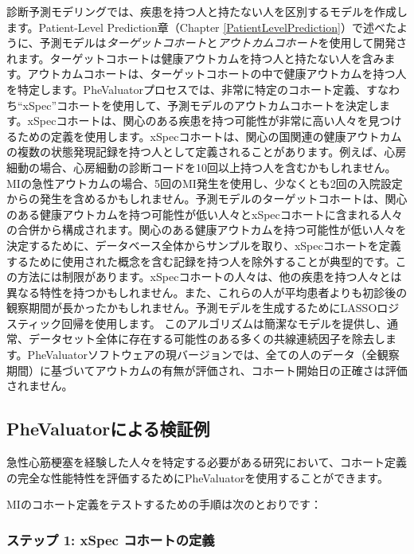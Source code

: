 \documentclass[
  11pt]{book}
\theoremstyle{definition}
\theoremstyle{definition}
\theoremstyle{definition}
\theoremstyle{definition}
\theoremstyle{remark}
\begin{document}
診断予測モデリングでは、疾患を持つ人と持たない人を区別するモデルを作成します。Patient-Level Prediction章（Chapter \ref{PatientLevelPrediction}）で述べたように、予測モデルは\emph{ターゲットコホート}と\emph{アウトカムコホート}を使用して開発されます。ターゲットコホートは健康アウトカムを持つ人と持たない人を含みます。アウトカムコホートは、ターゲットコホートの中で健康アウトカムを持つ人を特定します。PheValuatorプロセスでは、非常に特定のコホート定義、すなわち``xSpec''コホートを使用して、予測モデルのアウトカムコホートを決定します。xSpecコホートは、関心のある疾患を持つ可能性が非常に高い人々を見つけるための定義を使用します。xSpecコホートは、関心の国関連の健康アウトカムの複数の状態発現記録を持つ人として定義されることがあります。例えば、心房細動の場合、心房細動の診断コードを10回以上持つ人を含むかもしれません。MIの急性アウトカムの場合、5回のMI発生を使用し、少なくとも2回の入院設定からの発生を含めるかもしれません。予測モデルのターゲットコホートは、関心のある健康アウトカムを持つ可能性が低い人々とxSpecコホートに含まれる人々の合併から構成されます。関心のある健康アウトカムを持つ可能性が低い人々を決定するために、データベース全体からサンプルを取り、xSpecコホートを定義するために使用された概念を含む記録を持つ人を除外することが典型的です。この方法には制限があります。xSpecコホートの人々は、他の疾患を持つ人々とは異なる特性を持つかもしれません。また、これらの人が平均患者よりも初診後の観察期間が長かったかもしれません。予測モデルを生成するためにLASSOロジスティック回帰を使用します。\citep{suchard_2013} このアルゴリズムは簡潔なモデルを提供し、通常、データセット全体に存在する可能性のある多くの共線連続因子を除去します。PheValuatorソフトウェアの現バージョンでは、全ての人のデータ（全観察期間）に基づいてアウトカムの有無が評価され、コホート開始日の正確さは評価されません。

\subsection{PheValuatorによる検証例}\label{phevaluatorux306bux3088ux308bux691cux8a3cux4f8b}

急性心筋梗塞を経験した人々を特定する必要がある研究において、コホート定義の完全な性能特性を評価するためにPheValuatorを使用することができます。

MIのコホート定義をテストするための手順は次のとおりです：

\subsubsection*{ステップ 1: xSpec コホートの定義}\label{ux30b9ux30c6ux30c3ux30d7-1-xspec-ux30b3ux30dbux30fcux30c8ux306eux5b9aux7fa9}
\end{document}
